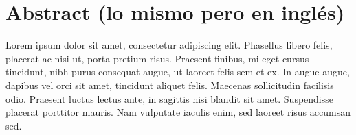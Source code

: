 \section*{Abstract (lo mismo pero en inglés)}

Lorem ipsum dolor sit amet, consectetur adipiscing elit. Phasellus libero felis, placerat ac nisi ut, porta pretium risus. Praesent finibus, mi eget cursus tincidunt, nibh purus consequat augue, ut laoreet felis sem et ex. In augue augue, dapibus vel orci sit amet, tincidunt aliquet felis. Maecenas sollicitudin facilisis odio. Praesent luctus lectus ante, in sagittis nisi blandit sit amet. Suspendisse placerat porttitor mauris. Nam vulputate iaculis enim, sed laoreet risus accumsan sed.

